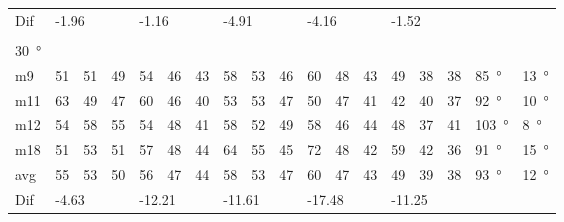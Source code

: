 \begin{table}[H]
\begin{tabular}{l|l|l|l|l|l|l|l|l|l|l|l|l|l|l|l|l|l}
Dif & \multicolumn{3}{l|}{-1.96} & \multicolumn{3}{l|}{-1.16} & \multicolumn{3}{l|}{-4.91} & \multicolumn{3}{l|}{-4.16} &  \multicolumn{3}{l|}{-1.52} &  \multicolumn{2}{l}{}  \\ 
 \multicolumn{18}{l}{ } \\                         
\SI{30}{\degree}   & \multicolumn{3}{l|}{} & \multicolumn{3}{l|}{} & \multicolumn{3}{l|}{} & \multicolumn{3}{l|}{} &  \multicolumn{3}{l|}{}   &  \multicolumn{2}{l}{} \\  \hline
m9    &  51    &  51    &  49    &  54    &  46    &   43   &  58    &   53    &  46    &   60    &   48   &   43   & 49 & 38 & 38  & \SI{85}{\degree} & \SI{13}{\degree} \\
m11  &  63    &  49    &  47    &   60   &   46   &   40   &  53    &   53    &  47    &    50   &   47   &  41   & 42 & 40 & 37  & \SI{92}{\degree} & \SI{10}{\degree} \\
m12  &  54    &   58   &  55    &  54    &   48   &   41   &   58   &  52     &   49   &    58   &   46   &   44   & 48 & 37 & 41  & \SI{103}{\degree} & \SI{8}{\degree} \\
m18  &  51    &   53   &  51    &   57   &  48    &   44   &   64   &   55    &  45    &    72   &  48    &   42   & 59 & 42 & 36  & \SI{91}{\degree} & \SI{15}{\degree} \\ \hline
avg &  55    &  53    &  50    &  56    & 47     &  44    &   58   &  53     &  47    &  60     &   47   &  43    & 49 & 39  & 38  & \SI{93}{\degree} & \SI{12}{\degree} \\ \hline  
Dif & \multicolumn{3}{l|}{-4.63} & \multicolumn{3}{l|}{-12.21} & \multicolumn{3}{l|}{-11.61} & \multicolumn{3}{l|}{-17.48} & \multicolumn{3}{l|}{-11.25}   &  \multicolumn{2}{l}{}                              
\end{tabular}
\end{table}


